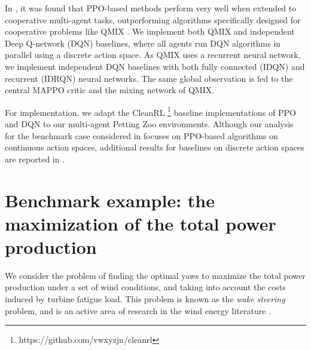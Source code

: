 \documentclass{article}
\newcommand{\md}[1]{{\color{red}#1}}
\begin{document}
In \cite{yu2022surprising}, it was found that PPO-based methods perform very well when extended to cooperative multi-agent tasks, outperforming algorithms specifically designed for cooperative problems like QMIX \cite{rashid2020monotonic}. We implement both QMIX and independent Deep Q-network (DQN) \cite{mnih2015human} baselines, where all agents run DQN algorithms in parallel using a discrete action space. As QMIX uses a recurrent neural network, we implement independent DQN baselines with both fully connected (IDQN) and recurrent (IDRQN) neural networks. The same global observation is fed to the central MAPPO critic and the mixing network of QMIX.

For implementation, we adapt the CleanRL \footnote{https://github.com/vwxyzjn/cleanrl} \cite{huang2022cleanrl} baseline implementations of PPO and DQN to our multi-agent Petting Zoo environments. Although our analysis for the benchmark case considered in  focuses on PPO-based algorithms on continuous action spaces, additional results for baselines on discrete action spaces are  reported in .

\medskip


\section{Benchmark example: the maximization of the total power production}\label{sec:benchmark}

%
We consider the problem of finding the optimal yaws to maximize the total power production under a set of wind conditions, and taking into account the costs induced by turbine fatigue load. This problem is known as the \textit{wake steering} problem, and is an active area of research in the wind energy literature \cite{houck2022review,howland2019windfarm}.
\end{document}
